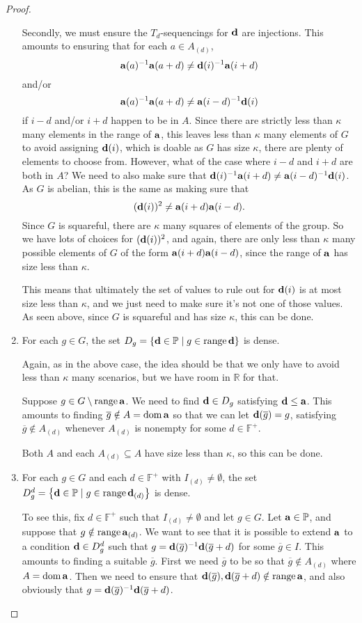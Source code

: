 \documentclass[12pt,a4paper]{article}
\newcommand{\R}{\mathbb{R}}
\newcommand{\F}{\mathbb{F}}
\DeclareMathOperator{\dom}{dom}
\DeclareMathOperator{\ran}{range}
\newcommand{\st}{\; | \;}
\newcommand{\set}[2]{\left\{#1\st #2 \right\}}
\renewcommand{\P}{\mathbb{P}}
\renewcommand{\a}{\textup{\textbf{a}}}
\renewcommand{\d}{\textup{\textbf{d}}}
\begin{document}
\begin{proof}
\begin{enumerate}
	Secondly, we must ensure the $T_d$-sequencings for $\d$ are injections. This amounts to ensuring that for each $a \in A_{(d)}$, 
		$$\a(a)^{-1}\a(a+d) \neq \d(i)^{-1}\a(i+d)$$ and/or
		$$\a(a)^{-1}\a(a+d) \neq \a(i-d)^{-1}\d(i)$$ if $i-d$ and/or $i+d$ happen to be in $A$. Since there are strictly less than $\kappa$ many elements in the range of $\a$, this leaves less than $\kappa$ many elements of $G$ to avoid assigning $\d(i)$, which is doable as $G$ has size $\kappa$, there are plenty of elements to choose from. 
	However, what of the case where $i-d$ and $i+d$ are both in $A$? We need to also make sure that $\d(i)^{-1}\a(i+d) \neq \a(i-d)^{-1}\d(i)$. As $G$ is abelian, this is the same as making sure that $$(\d(i))^2 \neq \a(i+d)\a(i-d).$$ Since $G$ is squareful, there are $\kappa$ many squares of elements of the group. So we have lots of choices for $(\d(i))^2$, and again, there are only less than $\kappa$ many possible elements of $G$ of the form $\a(i+d)\a(i-d)$, since the range of $\a$ has size less than $\kappa$.
	
	This means that ultimately the set of values to rule out for $\d(i)$ is at most size less than $\kappa$, and we just need to make sure it's not one of those values. As seen above, since $G$ is squareful and has size $\kappa$, this can be done. \\
	
	\item For each $g \in G$, the set $D_g=\set{\d \in \P}{g \in \ran \d }$ is dense. 
	
	Again, as in the above case, the idea should be that we only have to avoid less than $\kappa$ many scenarios, but we have room in $\R$ for that. 
	
	Suppose $g \in G \setminus \ran \a$. We need to find $\d \in D_g$ satisfying $\d \leq \a$. This amounts to finding $\overline g \notin A = \dom \a$ so that we can let $\d(\overline g)=g$, satisfying $\overline g \notin A_{(d)}$ whenever $A_{(d)}$ is nonempty for some $d \in \F^+$.
	
	Both $A$ and each $A_{(d)} \subseteq A$ have size less than $\kappa$, so this can be done. \\
		
	\item For each $g \in G$ and each $d \in \F^+$ with $I_{(d)}\neq \emptyset$, the set $D^d_g=\set{\d \in \P}{g \in \ran \d_{(d)}}$ is dense. 
	
	To see this, fix $d \in \F^+$ such that $I_{(d)}\neq \emptyset$ and let $g \in G$. Let $\a \in \P$, and suppose that $g \notin \ran\a_{(d)}$. We want to see that it is possible to extend $\a$ to a condition $\d \in D^d_g$ such that $g=\d(\overline g)^{-1}\d(\overline g+d)$ for some $\overline g \in I$. This amounts to finding a suitable $\overline g$. First we need $\overline g$ to be so that $\overline g \notin A_{(d)}$ where $A = \dom \a$. Then we need to ensure that $\d(\overline g), \d(\overline g+d) \notin \ran \a$, and also obviously that $g=\d(\overline g)^{-1}\d(\overline g+d)$. 


\end{enumerate}
\end{proof}
\end{document}
